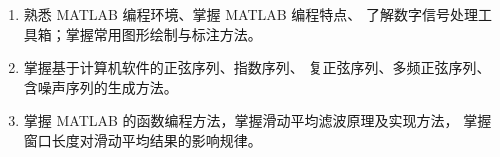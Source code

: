 \begin{enumerate}
    \item 熟悉 MATLAB 编程环境、掌握 MATLAB 编程特点、
            了解数字信号处理工具箱；掌握常用图形绘制与标注方法。
    \item 掌握基于计算机软件的正弦序列、指数序列、
            复正弦序列、多频正弦序列、含噪声序列的生成方法。
    \item 掌握 MATLAB 的函数编程方法，掌握滑动平均滤波原理及实现方法，
    掌握窗口长度对滑动平均结果的影响规律。
\end{enumerate}